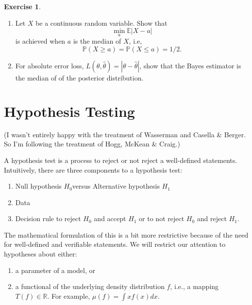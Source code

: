 \documentclass[
  openany]{book}
\providecommand{\tightlist}{%
  \setlength{\itemsep}{0pt}\setlength{\parskip}{0pt}}
\theoremstyle{definition}
\theoremstyle{definition}
\theoremstyle{definition}
\newtheorem{exercise}{Exercise}[chapter]
\theoremstyle{definition}
\theoremstyle{remark}
\begin{document}
\begin{exercise}
\leavevmode

\begin{enumerate}
\def\labelenumi{\arabic{enumi}.}
\item
  Let \(X\) be a continuous random variable. Show that
  \[\min_a \mathbb{E}|X - a|\]
  is achieved when \(a\) is the median of \(X\), i.e,
  \[ \mathbb{P}(X\geq a) = \mathbb{P}(X\leq a) = 1/2.\]
\item
  For absolute error loss, \(L(\theta,\hat \theta) = |\theta - \hat \theta|\), show that
  the Bayes estimator is the median of of the posterior distribution.
\end{enumerate}

\end{exercise}

\chapter{Hypothesis Testing}\label{hypothesis-testing}

(I wasn't entirely happy with the treatment of Wasserman and Casella \& Berger.
So I'm following the treatment of Hogg, McKean \& Craig.)

A hypothesis test is a process to reject or not reject a well-defined statements.
Intuitively, there are three components to a hypothesis test:

\begin{enumerate}
\def\labelenumi{\arabic{enumi}.}
\tightlist
\item
  Null hypothesis \(H_0\)versus Alternative hypothesis \(H_1\)
\item
  Data
\item
  Decision rule to reject \(H_0\) and accept \(H_1\) or to not reject \(H_0\) and reject \(H_1\).
\end{enumerate}

The mathematical formulation of this is a bit more restrictive because of the
need for well-defined and verifiable statements.
We will restrict our attention to hypotheses about either:

\begin{enumerate}
\def\labelenumi{\arabic{enumi}.}
\tightlist
\item
  a parameter of a model, or
\item
  a functional of the underlying density distribution \(f\), i.e., a mapping \(T(f) \in \mathbb{R}\).
  For example, \(\mu(f) = \int x  f(x) dx\).
\end{enumerate}
\end{document}
